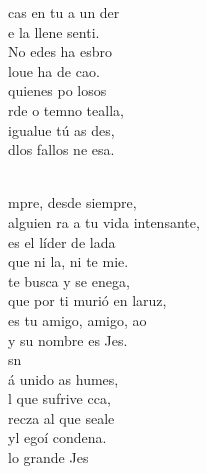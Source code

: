 \begin{cancion}%
	cas en tu a un der \\
	e la llene senti.\\
	No edes ha esbro\\
	loue ha de  cao.\\
	quienes po losos  \\
	rde o temno tealla,\\
	igualue tú as des,\\
	dlos fallos ne esa.\\\jump\\
	\begin{chorus}%
	mpre, desde siempre,\\
	alguien ra a tu vida intensante,\\
	es el líder de lada\\
	que ni la, ni te mie.\\
	 te busca y se enega,\\
	que por ti murió en laruz,\\
	es tu amigo, amigo, ao\\
	y su nombre es Jes.\\
	sn    \\
	á unido as humes, \\
	l que sufrive cca,\\
	recza al que seale\\
	yl egoí condena.\\
	 lo grande Jes  \\

\end{chorus}
\end{cancion}
